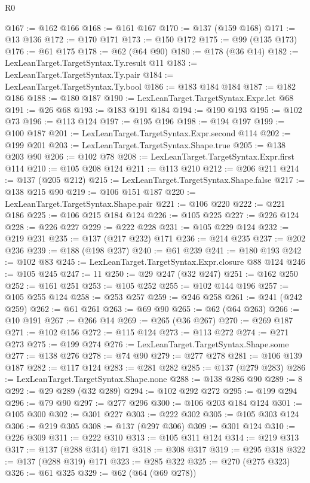 \begin{lexlean}{R0}
\begin{coremodule}
{{{{{{{{{{{{{{{{{{{{{{{{{{{{{{{{{{{{{{{{{{{{{{{{{{{{{{{{{{{{{{{{{{{{{{{{{{{{{{{{{{{{{{@167 := @162 @166
@168 := @161 @167
@170 := @137 (@159 @168)
@171 := @13 @136
@172 := @170 @171
@173 := @150 @172
@175 := @99 (@135 @173)
@176 := @61 @175
@178 := @62 (@64 @90)
@180 := @178 (@36 @14)
@182 := LexLeanTarget.TargetSyntax.Ty.result @11
@183 := LexLeanTarget.TargetSyntax.Ty.pair
@184 := LexLeanTarget.TargetSyntax.Ty.bool
@186 := @183 @184 @184
@187 := @182 @186
@188 := @180 @187
@190 := LexLeanTarget.TargetSyntax.Expr.let @68
@191 := @26 @68
@193 := @183 @191 @184
@194 := @190 @193
@195 := @102 @73
@196 := @113 @124
@197 := @195 @196
@198 := @194 @197
@199 := @100 @187
@201 := LexLeanTarget.TargetSyntax.Expr.second @114
@202 := @199 @201
@203 := LexLeanTarget.TargetSyntax.Shape.true
@205 := @138 @203 @90
@206 := @102 @78
@208 := LexLeanTarget.TargetSyntax.Expr.first @114
@210 := @105 @208 @124
@211 := @113 @210
@212 := @206 @211
@214 := @137 (@205 @212)
@215 := LexLeanTarget.TargetSyntax.Shape.false
@217 := @138 @215 @90
@219 := @106 @151 @187
@220 := LexLeanTarget.TargetSyntax.Shape.pair
@221 := @106 @220
@222 := @221 @186
@225 := @106 @215 @184 @124
@226 := @105 @225
@227 := @226 @124
@228 := @226 @227
@229 := @222 @228
@231 := @105 @229 @124
@232 := @219 @231
@235 := @137 (@217 @232) @171
@236 := @214 @235
@237 := @202 @236
@239 := @188 (@198 @237)
@240 := @61 @239
@241 := @180 @193
@242 := @102 @83
@245 := LexLeanTarget.TargetSyntax.Expr.closure @88 @124
@246 := @105 @245
@247 := 11
@250 := @29 @247 (@32 @247)
@251 := @162 @250
@252 := @161 @251
@253 := @105 @252
@255 := @102 @144 @196
@257 := @105 @255 @124
@258 := @253 @257
@259 := @246 @258
@261 := @241 (@242 @259)
@262 := @61 @261
@263 := @69 @90
@265 := @62 (@64 @263)
@266 := @10 @191
@267 := @266 @14
@269 := @265 (@36 @267)
@270 := @269 @187
@271 := @102 @156
@272 := @115 @124
@273 := @113 @272
@274 := @271 @273
@275 := @199 @274
@276 := LexLeanTarget.TargetSyntax.Shape.some
@277 := @138 @276
@278 := @74 @90
@279 := @277 @278
@281 := @106 @139 @187
@282 := @117 @124
@283 := @281 @282
@285 := @137 (@279 @283)
@286 := LexLeanTarget.TargetSyntax.Shape.none
@288 := @138 @286 @90
@289 := 8
@292 := @29 @289 (@32 @289)
@294 := @102 @292 @272
@295 := @199 @294
@296 := @79 @90
@297 := @277 @296
@300 := @106 @203 @184 @124
@301 := @105 @300
@302 := @301 @227
@303 := @222 @302
@305 := @105 @303 @124
@306 := @219 @305
@308 := @137 (@297 @306)
@309 := @301 @124
@310 := @226 @309
@311 := @222 @310
@313 := @105 @311 @124
@314 := @219 @313
@317 := @137 (@288 @314) @171
@318 := @308 @317
@319 := @295 @318
@322 := @137 (@288 @319) @171
@323 := @285 @322
@325 := @270 (@275 @323)
@326 := @61 @325
@329 := @62 (@64 (@69 @278))
}}}}}}}}}}}}}}}}}}}}}}}}}}}}}}}}}}}}}}}}}}}}}}}}}}}}}}}}}}}}}}}}}}}}}}}}}}}}}}}}}}}}}}
\end{coremodule}
\end{lexlean}
